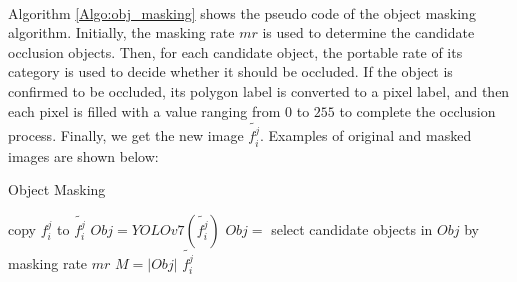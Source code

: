 \documentclass[a4paper,12pt]{report}
\begin{document}
\paragraph{}
Algorithm \ref{Algo:obj_masking} shows the pseudo code of the object masking algorithm. Initially, the masking rate $mr$ is used to determine the candidate occlusion objects. Then, for each candidate object, the portable rate of its category is used to decide whether it should be occluded. If the object is confirmed to be occluded, its polygon label is converted to a pixel label, and then each pixel is filled with a value ranging from $0$ to $255$ to complete the occlusion process. Finally, we get the new image $\widetilde{f_i^j}$. Examples of original and masked images are shown below:

\begin{algorithm}[H]
    \SetAlgoLined
    \DontPrintSemicolon
    \caption{Object Masking}
    \label{Algo:obj_masking}
    \BlankLine
    \BlankLine
    copy $f_i^j$ to $\widetilde{f_i^j}$ \;
    $Obj=YOLOv7(\widetilde{f_i^j})$ 
    $Obj=$ select candidate objects in $Obj$ by masking rate $mr$ \;
    $M=|Obj|$ 
    \Return $\widetilde{f_i^j}$
\end{algorithm}
\end{document}
